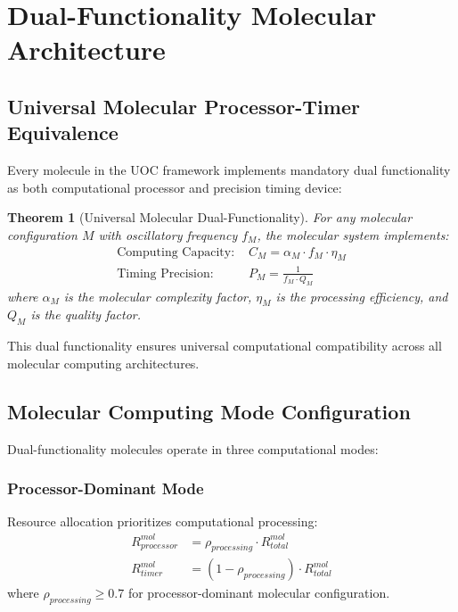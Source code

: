 \documentclass[12pt,a4paper]{article}
\newtheorem{theorem}{Theorem}[section]
\begin{document}
\section{Dual-Functionality Molecular Architecture}

\subsection{Universal Molecular Processor-Timer Equivalence}

Every molecule in the UOC framework implements mandatory dual functionality as both computational processor and precision timing device:

\begin{theorem}[Universal Molecular Dual-Functionality]
For any molecular configuration $M$ with oscillatory frequency $f_M$, the molecular system implements:
\begin{align}
\text{Computing Capacity: } &C_M = \alpha_M \cdot f_M \cdot \eta_M \\
\text{Timing Precision: } &P_M = \frac{1}{f_M \cdot Q_M}
\end{align}
where $\alpha_M$ is the molecular complexity factor, $\eta_M$ is the processing efficiency, and $Q_M$ is the quality factor.
\end{theorem}

This dual functionality ensures universal computational compatibility across all molecular computing architectures.

\subsection{Molecular Computing Mode Configuration}

Dual-functionality molecules operate in three computational modes:

\subsubsection{Processor-Dominant Mode}

Resource allocation prioritizes computational processing:
\begin{align}
R_{processor}^{mol} &= \rho_{processing} \cdot R_{total}^{mol} \\
R_{timer}^{mol} &= (1 - \rho_{processing}) \cdot R_{total}^{mol}
\end{align}
where $\rho_{processing} \geq 0.7$ for processor-dominant molecular configuration.
\end{document}
